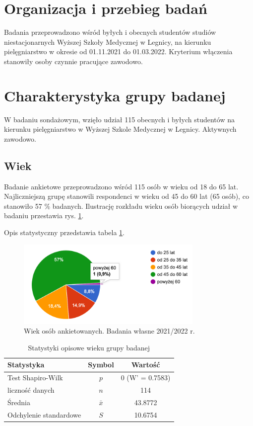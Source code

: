 \documentclass[a4paper,12pt,twoside,openany]{report}
\begin{document}
\section{Organizacja i przebieg badań}
Badania przeprowadzono wśród byłych i obecnych studentów studiów niestacjonarnych Wyższej Szkoły Medycznej w Legnicy, na kierunku pielęgniarstwo w okresie od 01.11.2021 do 01.03.2022. Kryterium włączenia stanowiły osoby czynnie pracujące zawodowo. 


\section{Charakterystyka grupy badanej}

W badaniu sondażowym, wzięło udział 115 obecnych i byłych studentów na kierunku pielęgniarstwo w Wyższej Szkole Medycznej w Legnicy. Aktywnych zawodowo.

\subsection{Wiek}

Badanie ankietowe przeprowadzono wśród 115 osób w wieku od 18 do 65 lat. Najliczniejszą grupę stanowili respondenci w wieku od 45 do 60 lat (65 osób), co stanowiło 57 \% badanych.
Ilustrację rozkładu wieku osób biorących udział w badaniu przestawia rys. \ref{rys:wiek}.

Opis statystyczny przedstawia tabela \ref{tab:wiek}.



\begin{figure}
\includegraphics[width=9cm]{char_gr_bad/wiek00}
\caption{Wiek osób ankietowanych. Badania własne 2021/2022 r.}
\label{rys:wiek}
\end{figure}


\begin {table}
\caption{Statystyki opisowe wieku grupy badanej}
\begin{tabular}{|l|c|c|}
\hline
Statystyka & Symbol & Wartość\\
\hline
Test Shapiro-Wilk & $p$ & 0 (W' = 0.7583)\\
\hline
liczność danych & $n$ & 114\\
\hline
Średnia & $\bar{x}$ & 43.8772\\
\hline
Odchylenie standardowe & $S$ & 10.6754\\
\hline

\end{tabular}
\label{tab:wiek}
\end{table}
\end{document}
